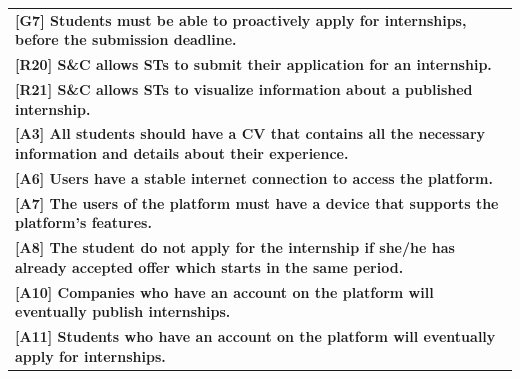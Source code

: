 \begin{center}
    \begin{tabular}{|p{37em}|}
        \rowcolor{bluepoli!40} %
        \hline
        \textbf{[G7] Students must be able to proactively apply for internships, before the submission deadline.} \\
        \rowcolor{bluepoli!15}
        \textbf{[R20] S\&C allows STs to submit their application for an internship.} \\
        \rowcolor{bluepoli!15}
        \textbf{[R21] S\&C allows STs to visualize information about a published internship.} \\
        \textbf{[A3] All students should have a CV that contains all the necessary information and details about their experience.} \\
        \textbf{[A6] Users have a stable internet connection to access the platform.}\\
        \textbf{[A7] The users of the platform must have a device that supports the platform's features.}\\
        \textbf{[A8] The student do not apply for the internship if she/he has already accepted offer which starts in the same period.}\\
        \textbf{[A10] Companies who have an account on the platform will eventually publish internships.}\\
        \textbf{[A11] Students who have an account on the platform will eventually apply for internships.}\\
        \hline
    \end{tabular}
\end{center}

